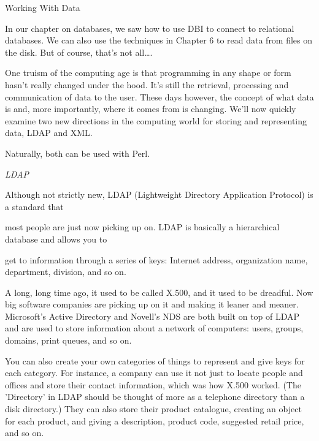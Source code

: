 \documentclass[a4paper,11pt]{book}
\begin{document}
\noindent 

\noindent 

\noindent Working With Data

\noindent 

\noindent In our chapter on databases, we saw how to use DBI to connect to relational databases. We can also use the techniques in Chapter 6 to read data from files on the disk. But of course, that's not all\dots .

\noindent 

\noindent One truism of the computing age is that programming in any shape or form hasn't really changed under the hood. It's still the retrieval, processing and communication of data to the user. These days however, the concept of what data is and, more importantly, where it comes from is changing. We'll now quickly examine two new directions in the computing world for storing and representing data, LDAP and XML.

\noindent Naturally, both can be used with Perl.

\noindent 

\noindent \textit{LDAP}

\noindent Although not strictly new, LDAP (Lightweight Directory Application Protocol) is a standard that

\noindent most people are just now picking up on. LDAP is basically a hierarchical database and allows you to

\noindent get to information through a series of keys: Internet address, organization name, department, division, and so on.

\noindent 

\noindent A long, long time ago, it used to be called X.500, and it used to be dreadful. Now big software companies are picking up on it and making it leaner and meaner. Microsoft's Active Directory and Novell's NDS are both built on top of LDAP and are used to store information about a network of computers: users, groups, domains, print queues, and so on.

\noindent 

\noindent You can also create your own categories of things to represent and give keys for each category. For instance, a company can use it not just to locate people and offices and store their contact information, which was how X.500 worked. (The 'Directory' in LDAP should be thought of more as a telephone directory than a disk directory.) They can also store their product catalogue, creating an object for each product, and giving a description, product code, suggested retail price, and so on.
\end{document}
